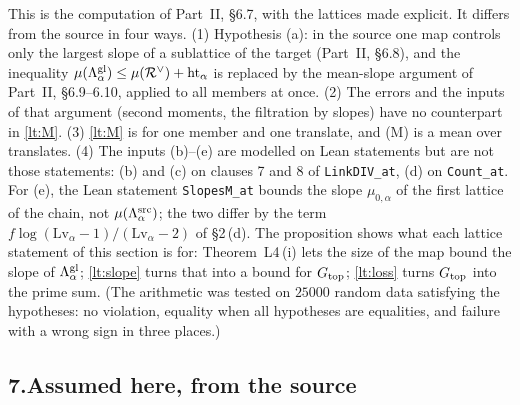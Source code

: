 \documentclass[11pt,letterpaper]{article}
\begin{document}
\noindent This is the computation of Part~II, \S6.7, with the lattices made explicit. It differs from the
source in four ways. (1) Hypothesis (a): in the source one map controls only the largest slope of a
sublattice of the target (Part~II, \S6.8), and the inequality
$\mu(\Lambda^{\rm gl}_\alpha)\le\mu(\mathcal R^\vee)+\mathrm{ht}_\alpha$ is replaced by the mean-slope
argument of Part~II, \S6.9--6.10, applied to all members at once. (2) The errors and the inputs of that
argument (second moments, the filtration by slopes) have no counterpart in \eqref{lt:M}. (3)
\eqref{lt:M} is for one member and one translate, and (M) is a mean over translates. (4) The inputs
(b)--(e) are modelled on Lean statements but are not those statements: (b) and (c) on clauses 7 and 8 of
\texttt{LinkDIV\_at}, (d) on \texttt{Count\_at}. For (e), the Lean statement \texttt{SlopesM\_at} bounds
the slope $\mu_{0,\alpha}$ of the first lattice of the chain, not $\mu(\Lambda^{\rm src}_\alpha)$; the two
differ by the term $f\log(\mathrm{Lv}_\alpha-1)/(\mathrm{Lv}_\alpha-2)$ of \S2\,(d). The proposition shows
what each lattice statement of this section is for: Theorem~L4\,(i) lets the size of the map bound the
slope of $\Lambda^{\rm gl}_\alpha$; \eqref{lt:slope} turns that into a bound for $G_{\rm top}$;
\eqref{lt:loss} turns $G_{\rm top}$ into the prime sum. (The arithmetic was tested on $25000$ random data
satisfying the hypotheses: no violation, equality when all hypotheses are equalities, and failure with a
wrong sign in three places.)

\subsection*{7.\quad Assumed here, from the source}
\end{document}
